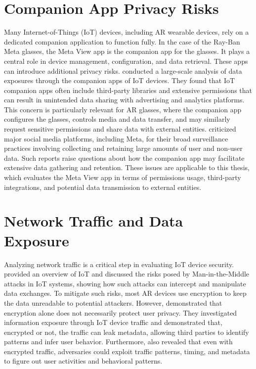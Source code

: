 \section*{Companion App Privacy Risks}
Many Internet-of-Things (IoT) devices, including AR wearable devices, rely on a dedicated companion application to function fully. In the case of the Ray-Ban Meta glasses, the Meta View app is the companion app for the glasses. It plays a central role in device management, configuration, and data retrieval. These apps can introduce additional privacy risks. \citet{USENIXSecurity2023} conducted a large-scale analysis of data exposures through the companion apps of IoT devices. They found that IoT companion apps often include third-party libraries and extensive permissions that can result in unintended data sharing with advertising and analytics platforms. This concern is particularly relevant for AR glasses, where the companion app configures the glasses, controls media and data transfer, and may similarly request sensitive permissions and share data with external entities. \citet{FTCSurveillance2024} criticized major social media platforms, including Meta, for their broad surveillance practices involving collecting and retaining large amounts of user and non-user data. Such reports raise questions about how the companion app may facilitate extensive data gathering and retention. These issues are applicable to this thesis, which evaluates the Meta View app in terms of permissions usage, third-party integrations, and potential data transmission to external entities.

\section*{Network Traffic and Data Exposure}
Analyzing network traffic is a critical step in evaluating IoT device security. \citet{fereidouni2023iotmaninthemiddleattacks} provided an overview of IoT and discussed the risks posed by Man-in-the-Middle attacks in IoT systems, showing how such attacks can intercept and manipulate data exchanges. To mitigate such risks, most AR devices use encryption to keep the data unreadable to potential attackers. However, \citet{Ren2019InformationEF} demonstrated that encryption alone does not necessarily protect user privacy. They investigated information exposure through IoT device traffic and demonstrated that, encrypted or not, the traffic can leak metadata, allowing third parties to identify patterns and infer user behavior. Furthermore, \citet{Acar_2020} also revealed that even with encrypted traffic, adversaries could exploit traffic patterns, timing, and metadata to figure out user activities and behavioral patterns.

